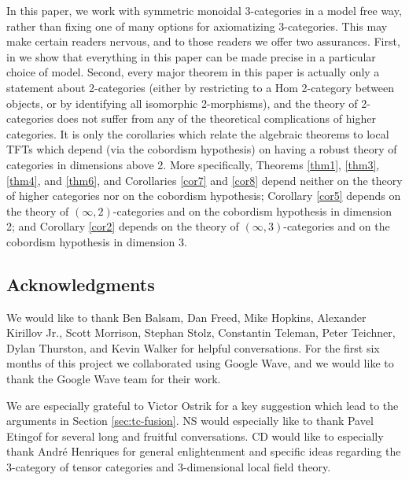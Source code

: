 \documentclass{amsart}
\begin{document}
In this paper, we work with symmetric monoidal 3-categories in a model free way, rather than fixing one of many options for axiomatizing 3-categories.  This may make certain readers nervous, and to those readers we offer two assurances.  First, in \cite{3TC} we show that everything in this paper can be made precise in a particular choice of model.  Second, every major theorem in this paper is actually only a statement about 2-categories (either by restricting to a Hom 2-category between objects, or by identifying all isomorphic 2-morphisms), and the theory of 2-categories does not suffer from any of the theoretical complications of higher categories.  It is only the corollaries which relate the algebraic theorems to local TFTs which depend (via the cobordism hypothesis) on having a robust theory of categories in dimensions above 2.  More specifically, Theorems \ref{thm1}, \ref{thm3}, \ref{thm4}, and \ref{thm6}, and Corollaries \ref{cor7} and \ref{cor8} depend neither
on the theory of higher categories nor on the cobordism hypothesis;
Corollary \ref{cor5} depends on the theory of $(\infty,2)$-categories and on the
cobordism hypothesis in dimension 2; and Corollary \ref{cor2} depends on the theory
of $(\infty,3)$-categories and on the cobordism hypothesis in dimension
3.

\subsection*{Acknowledgments}

We would like to thank Ben Balsam, Dan Freed, Mike Hopkins, Alexander Kirillov Jr., Scott Morrison, Stephan Stolz, Constantin Teleman, Peter Teichner, Dylan Thurston, and Kevin Walker for helpful conversations.   For the first six months of this project we collaborated using Google Wave, and we would like to thank the Google Wave team for their work.  

We are especially grateful to Victor Ostrik for a key suggestion which lead to the arguments in Section \ref{sec:tc-fusion}.
NS would especially like to thank Pavel Etingof for several long and fruitful conversations.  CD would like to especially thank Andr\'e Henriques for general enlightenment and specific ideas regarding the 3-category of tensor categories and 3-dimensional local field theory.
\end{document}
